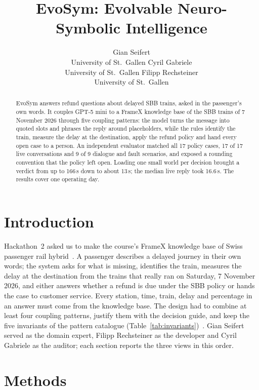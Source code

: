 \documentclass[10pt]{article}
\title{EvoSym: Evolvable Neuro-Symbolic Intelligence}
\author{\name Gian Seifert \\
      \addr University of St.\ Gallen
      \AND
      \name Cyril Gabriele \\
      \addr University of St.\ Gallen
      \AND
      \name Filipp Rechsteiner \\
      \addr University of St.\ Gallen}
\begin{document}
\maketitle

\begin{abstract}
EvoSym answers refund questions about delayed SBB trains, asked in the passenger's own words. It couples GPT-5 mini to a FrameX knowledge base of the SBB trains of 7 November 2026 through five coupling patterns: the model turns the message into quoted slots and phrases the reply around placeholders, while the rules identify the train, measure the delay at the destination, apply the refund policy and hand every open case to a person. An independent evaluator matched all 17 policy cases, 17 of 17 live conversations and 9 of 9 dialogue and fault scenarios, and exposed a rounding convention that the policy left open. Loading one small world per decision brought a verdict from up to 166\,s down to about 13\,s; the median live reply took 16.6\,s. The results cover one operating day.
\end{abstract}

\section{Introduction}
\label{sec:introduction}

Hackathon~2 asked us to make the course's FrameX knowledge base of Swiss passenger rail hybrid~\citep{h2task}. A passenger describes a delayed journey in their own words; the system asks for what is missing, identifies the train, measures the delay at the destination from the trains that really ran on Saturday, 7 November 2026, and either answers whether a refund is due under the SBB policy or hands the case to customer service. Every station, time, train, delay and percentage in an answer must come from the knowledge base. The design had to combine at least four coupling patterns, justify them with the decision guide, and keep the five invariants of the pattern catalogue (Table~\ref{tab:invariants})~\citep{handschuh2026patterns}. Gian Seifert served as the domain expert, Filipp Rechsteiner as the developer and Cyril Gabriele as the auditor; each section reports the three views in this order.

\section{Methods}
\label{sec:methods}




\end{document}
